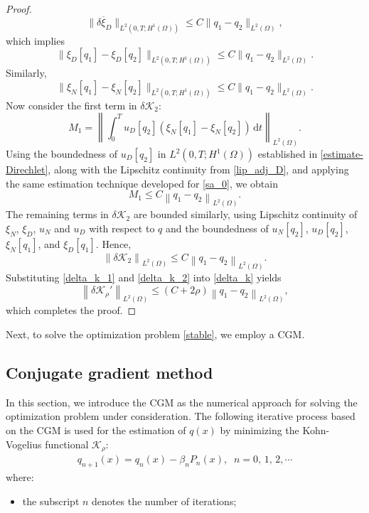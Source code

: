 \documentclass[a4paper,12pt,reqno,natbib]{amsart}
\begin{document}
{\begin{proof}
\begin{equation*}
\|\delta\overline{\xi}_D\|_{L^2(0,T;H^1(\Omega))}\leq C
\| q_1-q_2\|_{L^2(\Omega)},
\end{equation*}
which implies
\begin{equation} \label{lip_adj_D}
\|\xi_D[q_1]-\xi_D[q_2]\|_{L^2(0,T;H^1(\Omega))}\leq C
\| q_1-q_2\|_{L^2(\Omega)}.
\end{equation}
Similarly,
\begin{equation*} %
\|\xi_N[q_1]-\xi_N[q_2]\|_{L^2(0,T;H^1(\Omega))}\leq C
\| q_1-q_2\|_{L^2(\Omega)}.
\end{equation*}
Now consider the first term in \(\delta \mathcal{K}_2\):
\[
M_1 = \left\| \int_0^T u_D[q_2] (\xi_N[q_1] - \xi_N[q_2]) \, \mathrm{d}t \right\|_{L^2(\Omega)}.
\]
Using the boundedness of \(u_D[q_2]\) in \(L^2(0,T; H^1(\Omega))\) established in \eqref{estimate-Direchlet}, along with the Lipschitz continuity from \eqref{lip_adj_D}, and applying the same estimation technique developed for \eqref{sa_0}, we obtain
\[
M_1 \leq C \left\| q_1 - q_2 \right\|_{L^2(\Omega)}.
\]
The remaining terms in \(\delta \mathcal{K}_2\) are bounded similarly, using Lipschitz continuity of \(\xi_N\), \(\xi_D\), \(u_N\) and \(u_D\) with respect to \(q\) and the boundedness of \(u_N[q_2]\), \(u_D[q_2]\), \(\xi_N[q_1]\), and \(\xi_D[q_1]\). Hence,
\begin{equation} \label{delta_k_2}
    \left\| \delta \mathcal{K}_2 \right\|_{L^2(\Omega)} \leq C \left\| q_1 - q_2 \right\|_{L^2(\Omega)}.
\end{equation}
Substituting \eqref{delta_k_1} and \eqref{delta_k_2} into \eqref{delta_k} yields
\[
\left\| \delta \mathcal{K}_\rho' \right\|_{L^2(\Omega)} \leq (C + 2\rho) \left\| q_1 - q_2 \right\|_{L^2(\Omega)},
\]
which completes the proof.
\end{proof}

Next, to solve the optimization problem \eqref{stable}, we employ a CGM.




\subsection{Conjugate gradient method}\label{sec:I-PP}

In this section, we introduce the CGM as the numerical approach for solving the optimization problem under consideration. The following iterative process based on the CGM is used for the estimation of $q(x)$ by
minimizing the Kohn-Vogelius functional $\mathcal{K}_\rho:$
\begin{align} \label{qn}
    q_{n+1}(x)=q_n(x) - \beta_n P_n(x),\;\; n=0,\,1,\,2,\cdots
\end{align}
where:
\begin{itemize}
    \item[-] the subscript $n$ denotes the number of iterations;
    

\end{itemize}}
\end{document}
